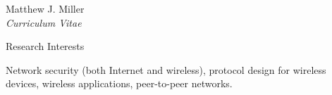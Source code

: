\documentclass[10pt]{article}
\begin{document}
\begin{cv}{Matthew J. Miller\\{\large \itshape Curriculum Vitae}}
 {
\begin{cvlist}{Research Interests}
    \item Network security (both Internet and wireless), 
    protocol design for wireless devices,
    wireless applications,
    peer-to-peer networks.

\end{cvlist}
} { 
}


\end{cv}
\end{document}
